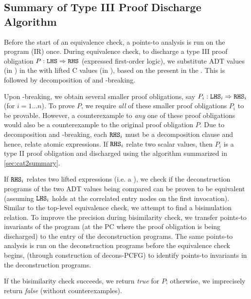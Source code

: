 \subsection{Summary of Type III Proof Discharge Algorithm}
\label{sec:cat3summary}

Before the start of an equivalence check, a points-to analysis is run on the \cprog{} program (IR) once.
During equivalence check, to discharge a type III proof obligation $P: {\tt LHS}{} \Rightarrow {\tt RHS}{}$
(expressed first-order logic), we substitute ADT values (in \sprog{}) in the \rhs{} with
lifted C values (in \cprog{}), based on the \recursiveRelations{} present in the \lhs{}.
This is followed by decomposition of \rhs{} and \rhs{}-breaking.

Upon \rhs{}-breaking, we obtain several smaller proof obligations,
say $P_i : {\tt LHS}{}_i \Rightarrow {\tt RHS}{}_i$ (for $i=1\ldots n$).
To prove $P$, we require {\em all} of these smaller proof obligations $P_i$ to be provable.
However, a counterexample to {\em any} one of these proof obligations would also be
a counterexample to the original proof obligation $P$.
Due to decomposition and \rhs{}-breaking, each ${\tt RHS}{}_i$ must be a decomposition clause
and hence, relate atomic expressions.
If ${\tt RHS}{}_i$ relate two scalar values, then $P_i$ is a type II proof obligation and
discharged using the algorithm summarized in \cref{sec:cat2summary}.

If ${\tt RHS}{}_i$ relates two lifted expressions (i.e. a \recursiveRelation{}),
we check if the deconstruction programs of the two ADT values being compared
can be proven to be equivalent (assuming ${\tt LHS}{}_i$ holds at the correlated entry nodes
on the first invocation).
Similar to the top-level equivalence check, we attempt to find a bisimulation relation.
To improve the precision during bisimilarity check, we transfer points-to invariants of the \cprog{}
program (at the PC where the proof obligation is being discharged) to the entry of the
deconstruction programs. The same points-to analysis is run on the deconstruction
programs before the equivalence check begins, (through construction of decons-PCFG)
to identify points-to invariants in the deconstruction programs.

If the bisimilarity check succeeds, we return {\em true} for $P$;
otherwise, we imprecisely return {\em false} (without counterexamples).



